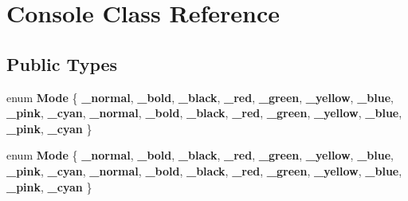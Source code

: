 \hypertarget{classConsole}{}\section{Console Class Reference}
\label{classConsole}
\subsection*{Public Types}
\begin{DoxyCompactItemize}
\item 
\mbox{\label{classConsole_af4999210d240ff9706a5a08a2fc7d80f}} 
enum {\bfseries Mode} \{ \newline
{\bfseries \+\_\+normal}, 
{\bfseries \+\_\+bold}, 
{\bfseries \+\_\+black}, 
{\bfseries \+\_\+red}, 
\newline
{\bfseries \+\_\+green}, 
{\bfseries \+\_\+yellow}, 
{\bfseries \+\_\+blue}, 
{\bfseries \+\_\+pink}, 
\newline
{\bfseries \+\_\+cyan}, 
{\bfseries \+\_\+normal}, 
{\bfseries \+\_\+bold}, 
{\bfseries \+\_\+black}, 
\newline
{\bfseries \+\_\+red}, 
{\bfseries \+\_\+green}, 
{\bfseries \+\_\+yellow}, 
{\bfseries \+\_\+blue}, 
\newline
{\bfseries \+\_\+pink}, 
{\bfseries \+\_\+cyan}
 \}
\item 
\mbox{\label{classConsole_af4999210d240ff9706a5a08a2fc7d80f}} 
enum {\bfseries Mode} \{ \newline
{\bfseries \+\_\+normal}, 
{\bfseries \+\_\+bold}, 
{\bfseries \+\_\+black}, 
{\bfseries \+\_\+red}, 
\newline
{\bfseries \+\_\+green}, 
{\bfseries \+\_\+yellow}, 
{\bfseries \+\_\+blue}, 
{\bfseries \+\_\+pink}, 
\newline
{\bfseries \+\_\+cyan}, 
{\bfseries \+\_\+normal}, 
{\bfseries \+\_\+bold}, 
{\bfseries \+\_\+black}, 
\newline
{\bfseries \+\_\+red}, 
{\bfseries \+\_\+green}, 
{\bfseries \+\_\+yellow}, 
{\bfseries \+\_\+blue}, 
\newline
{\bfseries \+\_\+pink}, 
{\bfseries \+\_\+cyan}
 \}
\end{DoxyCompactItemize}
